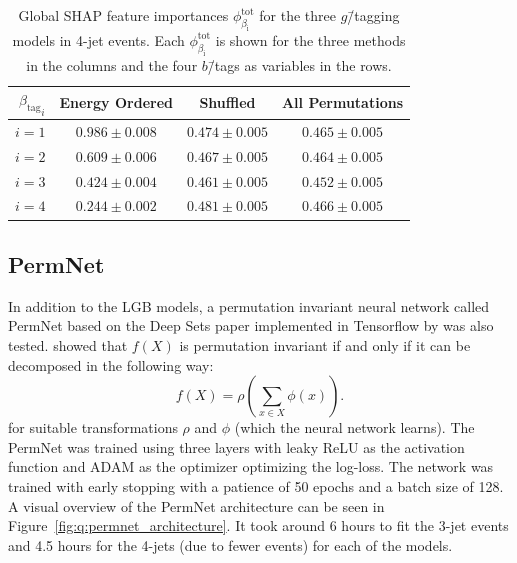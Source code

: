 \begin{table}[h!]
  \centerfloat
  \begin{tabular}{@{}rccc@{}}
  ${\beta_\mathrm{tag}}_i$  & Energy Ordered & Shuffled & All Permutations \\ \midrule
  $i=1$ & $ 0.986 \pm 0.008 $  &  $ 0.474 \pm 0.005 $  &  $ 0.465 \pm 0.005 $  \\
  $i=2$ & $ 0.609 \pm 0.006 $  &  $ 0.467 \pm 0.005 $  &  $ 0.464 \pm 0.005 $  \\
  $i=3$ & $ 0.424 \pm 0.004 $  &  $ 0.461 \pm 0.005 $  &  $ 0.452 \pm 0.005 $  \\
  $i=4$ & $ 0.244 \pm 0.002 $  &  $ 0.481 \pm 0.005 $  &  $ 0.466 \pm 0.005 $  \\ 
  \end{tabular}
  \caption[Global SHAP Feature Importances for the $g$\=/Tagging Models in 4-Jet Events]{Global SHAP feature importances $\phi^\mathrm{tot}_{\beta_\mathrm{i}}$ for the three $g$\=/tagging models in 4-jet events. Each $\phi^\mathrm{tot}_{\beta_\mathrm{i}}$ is shown for the three methods in the columns and the four $b$\=/tags as variables in the rows.}
  \label{table:q:shap_g_taggging_global_4j}
\end{table}


\subsection{PermNet}
\label{subsec:q:permnet}

In addition to the LGB models, a permutation invariant neural network called PermNet based on the Deep Sets paper \autocite{zaheerDeepSets2017} implemented in Tensorflow \citep{tensorflow2015-whitepaper} by \citet{fayeFrederikFayeDeepcalo} was also tested. \citet{zaheerDeepSets2017} showed that $f(X)$ is permutation invariant if and only if it can be decomposed in the following way:
\begin{equation}
  \label{eq:q:deep_sets}
  f(X)=\rho\left(\sum_{x\in X} \phi(x) \right).
\end{equation}
for suitable transformations $\rho$ and $\phi$ (which the neural network learns). The PermNet was trained using three layers with leaky ReLU \autocite{Maas2013RectifierNI} as the activation function and ADAM \autocite{kingmaAdamMethodStochastic2014} as the optimizer optimizing the log-loss. The network was trained with early stopping with a patience of \num{50} epochs and a batch size of \num{128}. A visual overview of the PermNet architecture can be seen in Figure~\ref{fig:q:permnet_architecture}. It took around \num{6} hours to fit the 3-jet events and \num{4.5} hours for the 4-jets (due to fewer events) for each of the models.

